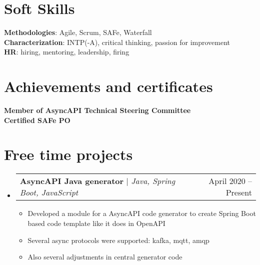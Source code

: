 \documentclass[letterpaper,11pt]{article}
\makeatletter
\newcommand{\resumeItem}[1]{
  \item\small{
    {#1 \vspace{-2pt}}
  }
}
\newcommand{\resumeProjectHeading}[2]{
    \item
    \begin{tabular*}{0.97\textwidth}{l@{\extracolsep{\fill}}r}
      \small#1 & #2 \\
    \end{tabular*}\vspace{-7pt}
}
\newcommand{\resumeSubHeadingListStart}{\begin{itemize}[leftmargin=0.15in, label={}]}
\newcommand{\resumeSubHeadingListEnd}{\end{itemize}}
\newcommand{\resumeItemListStart}{\begin{itemize}}
\newcommand{\resumeItemListEnd}{\end{itemize}\vspace{-5pt}}
\makeatother
\begin{document}
\section{Soft Skills}
 \begin{itemize}[leftmargin=0.15in, label={}]
    \small{\item{
     \textbf{Methodologies}{: Agile, Scrum, SAFe, Waterfall} \\
     \textbf{Characterization}{: INTP(-A), critical thinking, passion for improvement} \\
     \textbf{HR}{: hiring, mentoring, leadership, firing}
    }}
 \end{itemize}

\section{Achievements and certificates}
 \begin{itemize}[leftmargin=0.15in, label={}]
    \small{\item{
     \textbf{Member of AsyncAPI Technical Steering Committee}{} \\
     \textbf{Certified SAFe PO}{}
    }}
 \end{itemize}



\section{Free time projects}
    \resumeSubHeadingListStart
      \resumeProjectHeading
          {\textbf{AsyncAPI Java generator} $|$ \emph{Java, Spring Boot, JavaScript}}{April 2020 -- Present}
          \resumeItemListStart
            \resumeItem{Developed a module for a AsyncAPI code generator to create Spring Boot based code template like it does in OpenAPI}
            \resumeItem{Several async protocols were supported: kafka, mqtt, amqp}
            \resumeItem{Also several adjustments in central generator code}
          \resumeItemListEnd
    \resumeSubHeadingListEnd
\end{document}
